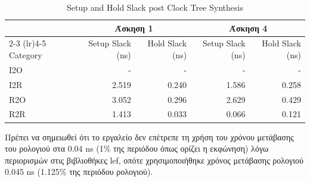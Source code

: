\begin{table}[H]
    \centering
    \caption{Setup and Hold Slack post Clock Tree Synthesis}
    \begin{tabular}{lrrrr}
        \toprule
         & \multicolumn{2}{c}{\textbf{Άσκηση 1}} & \multicolumn{2}{c}{\textbf{Άσκηση 4}} \\
        \cmidrule(lr){2-3} \cmidrule(lr){4-5}
        Category & Setup Slack (ns) & Hold Slack (ns) & Setup Slack (ns) & Hold Slack (ns) \\
        \midrule
        I2O & - & - & - & - \\
        I2R & 2.519 & 0.240 & 1.586 & 0.258 \\
        R2O & 3.052 & 0.296 & 2.629 & 0.429 \\
        R2R & 1.413 & 0.033 & 0.066 & 0.121 \\
        \bottomrule
    \end{tabular}
\end{table}

\begin{table}[H]
    \centering
    \caption{Power Consumption per Category post Clock Tree Synthesis}
\end{table}

Πρέπει να σημειωθεί ότι το εργαλείο δεν επέτρεπε τη χρήση του χρόνου μετάβασης του ρολογιού στα 0.04 ns (1\% της περιόδου όπως ορίζει η εκφώνηση) λόγω περιορισμών στις βιβλιοθήκες lef, οπότε χρησιμοποιήθηκε χρόνος μετάβασης ρολογιού 0.045 ns (1.125\% της περιόδου ρολογιού).

